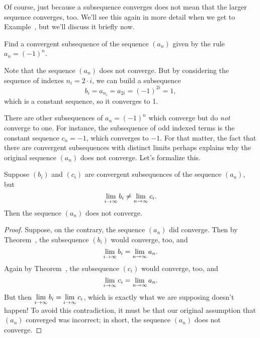 Of course, just because a subsequence converges does not mean that the
larger sequence converges, too.  We'll see this again in more detail
when we get to Example~, but we'll
discuss it briefly now.

\begin{example}
Find a convergent subsequence of the sequence $(a_n)$ given by the rule $a_n = (-1)^n$.
\end{example}

\begin{solution}
Note that the sequence $(a_n)$ does not converge.  But by considering the sequence of indexes $n_i = 2 \cdot i$, we can build a subsequence
$$
b_i = a_{n_i} = a_{2i} = (-1)^{2i} = 1,
$$
which is a constant sequence, so it converges to 1.
\end{solution}

There are other subsequences of $a_n = (-1)^n$ which converge but do
\textit{not} converge to one.  For instance, the subsequence of odd
indexed terms is the constant sequence $c_n = -1$, which converges to
$-1$.  For that matter, the fact that there are convergent
subsequences with distinct limits perhaps explains why the original
sequence $(a_n)$ does not converge.  Let's formalize this.

\begin{corollary}
  \label{corollary:different-subsequences-then-diverge}

  Suppose $(b_i)$ and $(c_i)$ are convergent subsequences of the sequence $(a_n)$, but
  $$
  \displaystyle\lim_{i \to \infty} b_i \neq \displaystyle\lim_{n \to \infty} c_i.
  $$
  Then the sequence $(a_n)$ does not converge.
\end{corollary}

\begin{proof}
  Suppose, on the contrary, the sequence $(a_n)$ did converge.  Then by
  Theorem~, the subsequence
  $(b_i)$ would converge, too, and
  $$
  \displaystyle\lim_{i \to \infty} b_i = \displaystyle\lim_{n \to \infty} a_n.
  $$
  Again by Theorem~, the subsequence
  $(c_i)$ would converge, too, and
  $$
  \displaystyle\lim_{i \to \infty} c_i = \displaystyle\lim_{n \to \infty} a_n.
  $$
  But then $\displaystyle\lim_{i \to \infty} b_i = \displaystyle\lim_{i \to \infty} c_i$,
  which is exactly what we are supposing doesn't happen!  To avoid
  this contradiction, it must be that our original assumption that
  $(a_n)$ converged was incorrect; in short, the sequence $(a_n)$ does
  not converge.
\end{proof}

